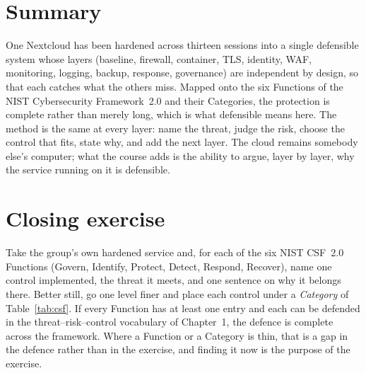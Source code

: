 \section{Summary}

One Nextcloud has been hardened across thirteen sessions into a single
defensible system whose layers (baseline, firewall, container, TLS,
identity, WAF, monitoring, logging, backup, response, governance) are
independent by design, so that each catches what the others miss. Mapped
onto the six Functions of the NIST Cybersecurity Framework~2.0 and their
Categories, the protection is complete rather than merely long, which is
what defensible means here. The method is the same at every layer: name the
threat, judge the risk, choose the control that fits, state why, and add the
next layer. The cloud remains somebody else's computer; what the course adds
is the ability to argue, layer by layer, why the service running on it is
defensible.

\section*{Closing exercise}

{\small
Take the group's own hardened service and, for each of the six NIST CSF~2.0
Functions (Govern, Identify, Protect, Detect, Respond, Recover), name one
control implemented, the threat it meets, and one sentence on why it belongs
there. Better still, go one level finer and place each control under a
\emph{Category} of Table~\ref{tab:csf}. If every Function has at least one
entry and each can be defended in the threat--risk--control vocabulary of
Chapter~1, the defence is complete across the framework. Where a Function or a
Category is thin, that is a gap in the defence rather than in the exercise,
and finding it now is the purpose of the exercise.}



